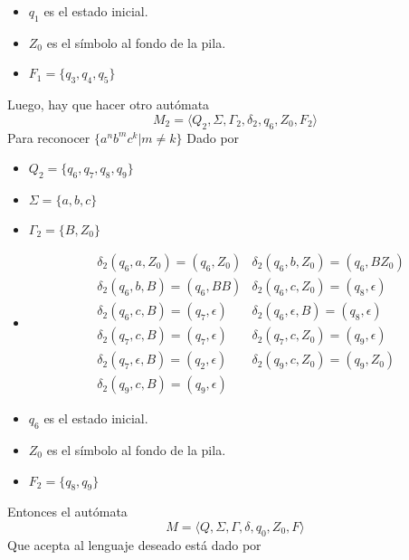 \documentclass{article}
\begin{document}
\begin{enumerate}
{\begin{enumerate}
{\begin{itemize}
	         	\item {
	         		$q_1$ es el estado inicial.
	         	}
	         	\item {
	         		$Z_0$ es el símbolo al fondo de la pila.
	         	}
	         	\item {
	         		$F_1 = \{q_3, q_4, q_5\}$
	         	}
	         \end{itemize}

	     	Luego, hay que hacer otro autómata
	     	\[M_2 = \langle Q_2 , \Sigma, \Gamma_2 , \delta_2, q_6 , Z_0,
	     	F_2\rangle\]
	     	Para reconocer $\{a^nb^mc^k | m \neq k\}$
	     	Dado por
	     	\begin{itemize}
	     		\item {
	     			$Q_2 = \{q_6, q_7, q_8, q_9\}$
     			}

     			\item {
     				$\Sigma = \{a, b, c\}$
     			}
     			\item {
     				$\Gamma_2 = \{B, Z_0\}$
     			}
	     		\item {
	     			\begin{align*}
	     			&\delta_2 (q_6, a, Z_0) = (q_6, Z_0)
	     			&\delta_2 (q_6, b, Z_0) = (q_6, BZ_0) \\
	     			&\delta_2 (q_6, b, B) = (q_6, BB)
	     			&\delta_2 (q_6, c, Z_0) = (q_8, \epsilon) \\
	     			&\delta_2 (q_6, c, B) = (q_7, \epsilon)
	     			&\delta_2 (q_6, \epsilon, B) = (q_8, \epsilon) \\
	     			&\delta_2 (q_7, c, B) = (q_7, \epsilon)
	     			&\delta_2 (q_7, c, Z_0) = (q_9, \epsilon) \\
	     			&\delta_2 (q_7, \epsilon, B) = (q_2, \epsilon)
	     			&\delta_2 (q_9, c, Z_0) = (q_9, Z_0) \\
	     			&\delta_2 (q_9, c, B) = (q_9, \epsilon)
	     			\end{align*}
	     		}
	     		\item {
	     			$q_6$ es el estado inicial.
	     		}
	     		\item {
	     			$Z_0$ es el símbolo al fondo de la pila.
	     		}
	     		\item {
	     			$F_2 = \{q_8, q_9\}$
	     		}
	     	\end{itemize}

	        Entonces el autómata
	        \[M = \langle Q , \Sigma, \Gamma , \delta, q_0 , Z_0,
	        F\rangle\]
	        Que acepta al lenguaje deseado está dado por

}
\end{enumerate}}
\end{enumerate}
\end{document}
